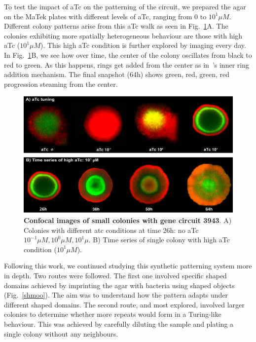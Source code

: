 To test the impact of aTc on the patterning of the circuit, we prepared the agar on the MaTek plates with different levels of aTc, ranging from 0 to $10^1 \mu M$.
Different colony patterns arise from this aTc walk as seen in Fig.~\ref{atcwalk_timeseries_confocal}A.
The colonies exhibiting more spatially heterogeneous behaviour are those with high aTc ($10^1 \mu M$).
This high aTc condition is further explored by imaging every day.
In Fig.~\ref{atcwalk_timeseries_confocal}B, we see how over time, the center of the colony oscillates from black to red to green.
As this happens, rings get added from the center as in~\cite{Konow2019}'s inner ring addition mechanism.
The final snapshot (64h) shows green, red, green, red progression steaming from the center.

\begin{figure}[H]

    \includegraphics[width=1\textwidth]{chapters/Chapter 3/atcwalk_timeseries_confocal}
    \caption{\textbf{Confocal images of small colonies with gene circuit 3943}. A) Colonies with different atc conditions at time 26h: no aTc $10^{-1} \mu M,10^{0} \mu M,10^{1} \mu  $. B) Time series of single colony with high aTc condition ($10^1 \mu M$).}
    \label{atcwalk_timeseries_confocal}
\end{figure}

Following this work, we continued studying this synthetic patterning system more in depth.
Two routes were followed.
The first one involved specific shaped domains achieved by imprinting the agar with bacteria using shaped objects (Fig.~\ref{shmoo}).
The aim was to understand how the pattern adapts under different shaped domains.
The second route, and most explored, involved larger colonies to determine whether more repeats would form in a Turing-like behaviour.
This was achieved by carefully diluting the sample and plating a single colony without any neighbours.

